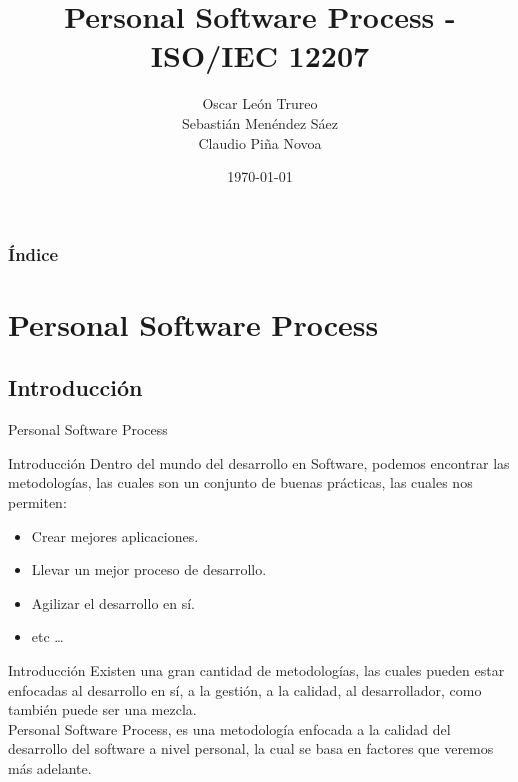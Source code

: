 \documentclass{beamer}
\title [Ingeniería en Software]{Personal Software Process - ISO/IEC 12207}
\author[Grupo 1]{Oscar León Trureo\\Sebastián Menéndez Sáez\\Claudio Piña Novoa}
\date{\today}
\institute[]{Universidad Tecnol\'ogica Metropolitana}
\begin{document}
\begin{frame}
	\maketitle
\end{frame}

\begin{frame}
	\frametitle{Índice}
	\tableofcontents[]
\end{frame}

\section{Personal Software Process}
		\subsection{Introducci\'on}
		
			\begin{frame}
				\begin{center}
					\begin{block}{}
						\begin{center}
							{\huge Personal Software Process}
						\end{center}
					\end{block}
				\end{center}
			\end{frame}			
		
			\begin{frame}{Introducci\'on}
				Dentro del mundo del desarrollo en Software, podemos encontrar las metodolog\'ias, las cuales son un conjunto de buenas pr\'acticas, las cuales nos permiten:\\ \pause
				\begin{itemize}
					\item Crear mejores aplicaciones.\pause
					\item Llevar un mejor proceso de desarrollo.\pause
					\item Agilizar el desarrollo en sí.\pause
					\item etc \ldots
				\end{itemize}				
			\end{frame}
			
			\begin{frame}{Introducci\'on}
				Existen una gran cantidad de metodologías, las cuales pueden estar enfocadas al desarrollo en sí, a la gestión, a la calidad, al desarrollador, como también puede ser una mezcla.\\
				\smallskip
				Personal Software Process, es una metodolog\'ia enfocada a la calidad del desarrollo del software a nivel personal, la cual se basa en factores que veremos más adelante.
			\end{frame}		
			
\end{document}
